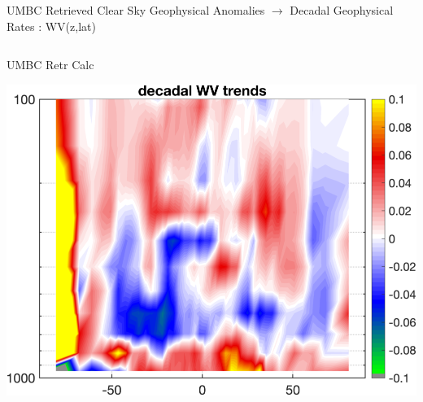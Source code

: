 \documentclass[10pt,t]{beamer}
\begin{document}
\begin{frame}{UMBC Retrieved Clear Sky Geophysical Anomalies $\rightarrow$ Decadal Geophysical Rates : WV(z,lat)}
\begin{columns}
\begin{column}{0.45\columnwidth}
\begin{block}{\footnotesize UMBC Retr Calc}
\vspace{-0.1in}
\begin{center}
\includegraphics[width=0.95\linewidth]{Figs/ClearAnom/umbc_clr_retr_cal_ptemp_rate_200209_201808.png}
\end{center}
\end{block}
\end{column}
\end{columns}

\end{frame}



\end{document}
